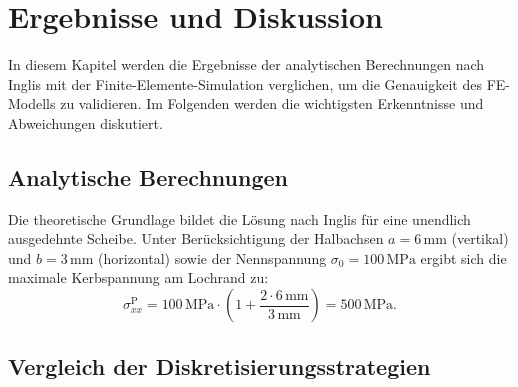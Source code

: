 \chapter{Ergebnisse und Diskussion}
\label{sec:Ergebnisse und Diskussion}

In diesem Kapitel werden die Ergebnisse der analytischen Berechnungen nach Inglis mit der Finite-Elemente-Simulation verglichen, um die Genauigkeit des FE-Modells zu validieren. Im Folgenden werden die wichtigsten Erkenntnisse und Abweichungen diskutiert.

\section{Analytische Berechnungen}
\label{Analytische Berechnung}

Die theoretische Grundlage bildet die Lösung nach Inglis für eine unendlich ausgedehnte Scheibe. Unter Berücksichtigung der Halbachsen ${a = 6\,\mathrm{mm}}$ (vertikal) und ${b = 3\,\mathrm{mm}}$ (horizontal) sowie der Nennspannung ${\sigma_0 = 100\,\mathrm{MPa}}$ ergibt sich die maximale Kerbspannung am Lochrand zu:
\begin{equation}
    \sigma_{xx}^{\mathrm{P}} = 100\,\mathrm{MPa} \cdot \left( 1 + \frac{2 \cdot 6\,\mathrm{mm}}{3\,\mathrm{mm}} \right) = 500\,\mathrm{MPa}.
\end{equation}

\section{Vergleich der Diskretisierungsstrategien}
\label{sec:Vergleich der Diskretisierungsstrategien}

